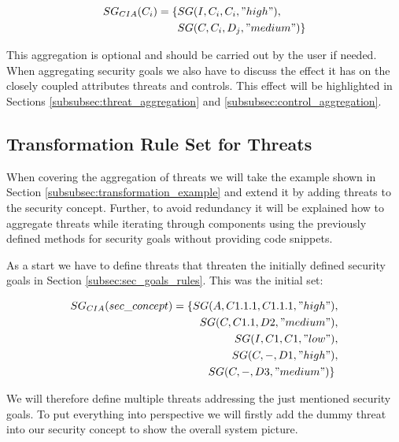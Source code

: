 \begin{align*}
SG_{CIA}(C_i) = \{&SG(I,C_i,C_i,"high"),\\ &SG(C,C_i,D_j, "medium")\} \\
\end{align*}

This aggregation is optional and should be carried out by the user if needed. When aggregating security goals we also have to discuss the effect it has on the closely coupled attributes threats and controls. This effect will be highlighted in Sections \ref{subsubsec:threat_aggregation} and \ref{subsubsec:control_aggregation}.
   
\subsection{Transformation Rule Set for Threats}
\label{subsec:threat_rules}

When covering the aggregation of threats we will take the example shown in Section \ref{subsubsec:transformation_example} and extend it by adding threats to the security concept. Further, to avoid redundancy it will be explained how to aggregate threats while iterating through components using the previously defined methods for security goals without providing code snippets. 

As a start we have to define threats that threaten the initially defined security goals in Section \ref{subsec:sec_goals_rules}. This was the initial set:

\begin{align*}
SG_{CIA}(sec\_concept) = \{SG(A,C1.1.1,C1.1.1,"high") &, \\ SG(C,C1.1,D2,"medium")&, \\
SG(I,C1,C1,"low")&, \\
SG(C,-,D1,"high")&, \\
SG(C,-,D3,"medium")\} 
\end{align*}

We will therefore define multiple threats addressing the just mentioned security goals. To put everything into perspective we will firstly add the \glqq dummy \grqq threat into our security concept to show the overall system picture.

